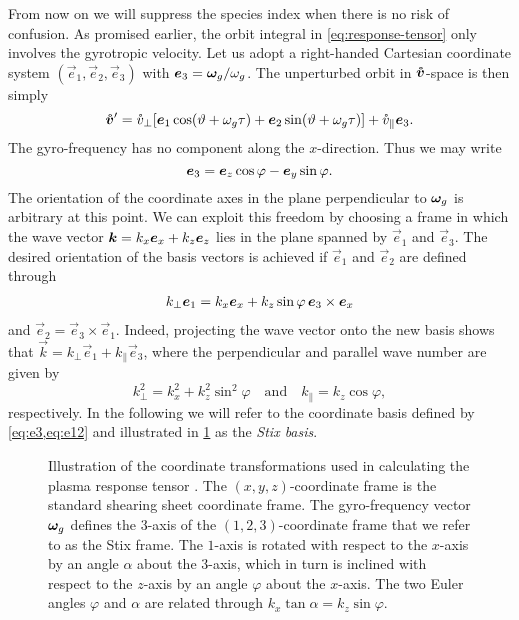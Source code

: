 \documentclass[aps,pre,notitlepage,amsmath,amssymb,amsfonts,nobibnotes,nofootinbib]{revtex4-1}
\begin{document}
From now on we will suppress the species index when there is no risk of
confusion. As promised earlier, the orbit integral in
\cref{eq:response-tensor} only involves the gyrotropic velocity. Let us adopt
a right-handed Cartesian coordinate system $(\vec{e}_1,\vec{e}_2,\vec{e}_3)$
with $\bm{e}_3=\bm{\omega}_g/\omega_g$. The unperturbed orbit in $\bm{\mathring{v}}$-space is then
simply
\begin{equation}
  \label{eq:vcirc-tau}
  \vvc' = \vc_\perp[\vec{e}_1\cos(\vartheta + \omg\tau)
  + \vec{e}_2\sin(\vartheta + \omg\tau)] + \vc_\parallel\vec{e}_3.
\end{equation}
The gyro-frequency has no component along the $x$-direction. Thus we may write
\begin{equation}
  \label{eq:e3}
  \vec{e}_3 = \ez\cos\varphi - \ey\sin\varphi.
\end{equation}
The orientation of the coordinate axes in the plane perpendicular to $\bm{\omega}_g$
is arbitrary at this point. We can exploit this freedom by choosing a frame in
which the wave vector $\bm{k}=k_x\bm{e}_x+k_z\bm{e}_z$ lies in the plane spanned by
$\vec{e}_1$ and $\vec{e}_3$. The desired orientation of the basis vectors is
achieved if $\vec{e}_1$ and $\vec{e}_2$ are defined through
\begin{align}
  \label{eq:e12}
  k_\perp\vec{e}_1 = k_x\ex + k_z\sin\varphi\,\vec{e}_3\times\ex
\end{align}
and $\vec{e}_2=\vec{e}_3\times\vec{e}_1$. Indeed, projecting the wave vector
onto the new basis shows that $\vec{k}=k_\perp\vec{e}_1+k_\parallel\vec{e}_3$,
where the perpendicular and parallel wave number are given by
\begin{equation}
  k_\perp^2 = k_x^2 + k_z^2\sin^2\varphi
  \quad\textrm{and}\quad
  k_\parallel = k_z\cos\varphi,
\end{equation}
respectively. In the following we will refer to the coordinate basis defined
by \cref{eq:e3,eq:e12} and illustrated in \cref{fig:stix} as the \emph{Stix
basis}.

\begin{figure}
  \centering
  
  \caption{Illustration of the coordinate transformations
     used in calculating the plasma response tensor
    . The $(x,y,z)$-coordinate frame
    is the standard shearing sheet coordinate frame. The gyro-frequency vector
    $\bm{\omega}_g$ defines the $3$-axis of the $(1,2,3)$-coordinate frame that we
    refer to as the Stix frame. The $1$-axis is rotated with respect to the
    $x$-axis by an angle $\alpha$ about the $3$-axis, which in turn is
    inclined with respect to the $z$-axis by an angle $\varphi$ about the
    $x$-axis. The two Euler angles $\varphi$ and $\alpha$ are related through
    $k_x\tan\alpha=k_z\sin\varphi$.}\label{fig:stix}
\end{figure}
\end{document}
